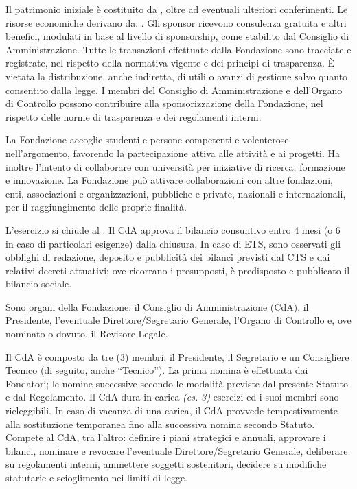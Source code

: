 Il patrimonio iniziale è costituito da , oltre ad eventuali ulteriori conferimenti.
 Le risorse economiche derivano da: \FontiFinanziamento. 
 Gli sponsor ricevono consulenza gratuita e altri benefici, modulati in base al livello di sponsorship, come stabilito dal Consiglio di Amministrazione.
 Tutte le transazioni effettuate dalla Fondazione sono tracciate e registrate, nel rispetto della normativa vigente e dei principi di trasparenza.
È vietata la distribuzione, anche indiretta, di utili o avanzi di gestione salvo quanto consentito dalla legge.
 I membri del Consiglio di Amministrazione e dell'Organo di Controllo possono contribuire alla sponsorizzazione della Fondazione, nel rispetto delle norme di trasparenza e dei regolamenti interni.

 La Fondazione accoglie studenti e persone competenti e volenterose nell’argomento, favorendo la partecipazione attiva alle attività e ai progetti. Ha inoltre l’intento di collaborare con università per iniziative di ricerca, formazione e innovazione.
 La Fondazione può attivare collaborazioni con altre fondazioni, enti, associazioni e organizzazioni, pubbliche e private, nazionali e internazionali, per il raggiungimento delle proprie finalità.

 L'esercizio si chiude al . Il CdA approva il bilancio consuntivo entro 4 mesi (o 6 in caso di particolari esigenze) dalla chiusura.
\ifETS
{} In caso di ETS, sono osservati gli obblighi di redazione, deposito e pubblicità dei bilanci previsti dal CTS e dai relativi decreti attuativi; ove ricorrano i presupposti, è predisposto e pubblicato il bilancio sociale.
\fi

 Sono organi della Fondazione: il Consiglio di Amministrazione (CdA), il Presidente, l'eventuale Direttore/Segretario Generale, l'Organo di Controllo e, ove nominato o dovuto, il Revisore Legale.

 Il CdA è composto da tre (3) membri: il Presidente, il Segretario e un Consigliere Tecnico (di seguito, anche ``Tecnico''). La prima nomina è effettuata dai Fondatori; le nomine successive secondo le modalità previste dal presente Statuto e dal Regolamento.
 Il CdA dura in carica \textit{(es. 3)} esercizi ed i suoi membri sono rieleggibili. In caso di vacanza di una carica, il CdA provvede tempestivamente alla sostituzione temporanea fino alla successiva nomina secondo Statuto.
 Compete al CdA, tra l'altro: definire i piani strategici e annuali, approvare i bilanci, nominare e revocare l'eventuale Direttore/Segretario Generale, deliberare su regolamenti interni, ammettere soggetti sostenitori, decidere su modifiche statutarie e scioglimento nei limiti di legge.

